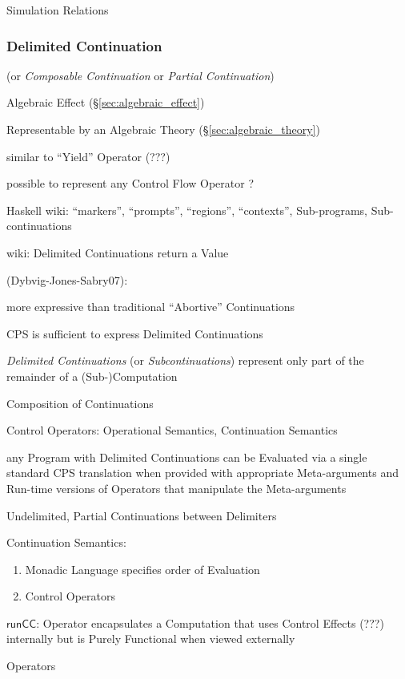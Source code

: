 Simulation Relations



\subsubsection{Delimited Continuation}\label{sec:delimited_continuation}

(or \emph{Composable Continuation} or \emph{Partial Continuation})

Algebraic Effect (\S\ref{sec:algebraic_effect})

Representable by an Algebraic Theory (\S\ref{sec:algebraic_theory})

similar to ``Yield'' Operator (???) %

possible to represent any Control Flow Operator ? %

Haskell wiki: ``markers'', ``prompts'', ``regions'', ``contexts'',
Sub-programs, Sub-continuations

wiki: Delimited Continuations return a Value


(Dybvig-Jones-Sabry07):

more expressive than traditional ``Abortive'' Continuations

CPS is sufficient to express Delimited Continuations

\emph{Delimited Continuations} (or \emph{Subcontinuations}) represent
only part of the remainder of a (Sub-)Computation

Composition of Continuations

Control Operators: Operational Semantics, Continuation Semantics

any Program with Delimited Continuations can be Evaluated via a single
standard CPS translation when provided with appropriate Meta-arguments
and Run-time versions of Operators that manipulate the Meta-arguments

Undelimited, Partial Continuations between Delimiters

Continuation Semantics:
\begin{enumerate}
  \item Monadic Language specifies order of Evaluation
  \item Control Operators
\end{enumerate}

$\mathsf{runCC}$: Operator encapsulates a Computation that uses Control
Effects (???) internally but is Purely Functional when viewed
externally %

Operators

